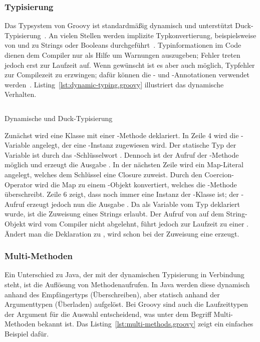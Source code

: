 \documentclass[a4paper]{article}
\newcommand{\codelisting}[3]{
\begin{listing}[ht]
	\inputminted{#1}{#1/#2}
	\caption{#3}
	\label{lst:#2}
\end{listing}
}
\begin{document}
\subsubsection{Typisierung}\label{subsubsec:typisierung}

Das Typsystem von Groovy ist standardmäßig dynamisch und unterstützt Duck-Typisierung~\cite[Abs.~6.]{groovy-lang:semantics}.
An vielen Stellen werden implizite Typkonvertierung, beispielsweise von und zu Strings oder Booleans durchgeführt~\cite[Abs.~3.]{groovy-lang:semantics}.
Typinformationen im Code dienen dem Compiler nur als Hilfe um Warnungen auszugeben; Fehler treten jedoch erst zur Laufzeit auf.
Wenn gewünscht ist es aber auch möglich, Typfehler zur Compilezeit zu erzwingen; dafür können die - und -Annotationen verwendet werden~\cite[Abs.~6.2.]{groovy-lang:semantics}.
Listing~\ref{lst:dynamic-typing.groovy} illustriert das dynamische Verhalten.

\codelisting{groovy}{dynamic-typing.groovy}{Dynamische und Duck-Typisierung}

Zunächst wird eine Klasse  mit einer -Methode deklariert.
In Zeile 4 wird die -Variable angelegt, der eine -Instanz zugewiesen wird.
Der statische Typ der Variable ist durch das -Schlüsselwort .
Dennoch ist der Aufruf der -Methode möglich und erzeugt die Ausgabe .
In der nächsten Zeile wird ein Map-Literal angelegt, welches dem Schlüssel  eine Closure zuweist.
Durch den Coercion-Operator  wird die Map zu einem -Objekt konvertiert, welches die -Methode überschreibt.
Zeile 6 zeigt, dass  noch immer eine Instanz der -Klasse ist; der -Aufruf erzeugt jedoch nun die Ausgabe .
Da  als Variable vom Typ  deklariert wurde, ist die Zuweisung eines Strings erlaubt.
Der Aufruf von  auf dem String-Objekt wird vom Compiler nicht abgelehnt, führt jedoch zur Laufzeit zu einer .
Ändert man die Deklaration zu , wird schon bei der Zuweisung eine  erzeugt.

\subsubsection{Multi-Methoden}

Ein Unterschied zu Java, der mit der dynamischen Typisierung in Verbindung steht, ist die Auflösung von Methodenaufrufen.
In Java werden diese dynamisch anhand des Empfängertyps (Überschreiben), aber statisch anhand der Argumenttypen (Überladen) aufgelöst.
Bei Groovy sind auch die Laufzeittypen der Argument für die Auswahl entscheidend, was unter dem Begriff Multi-Methoden bekannt ist.
Das Listing~\ref{lst:multi-methods.groovy} zeigt ein einfaches Beispiel dafür.
\end{document}
